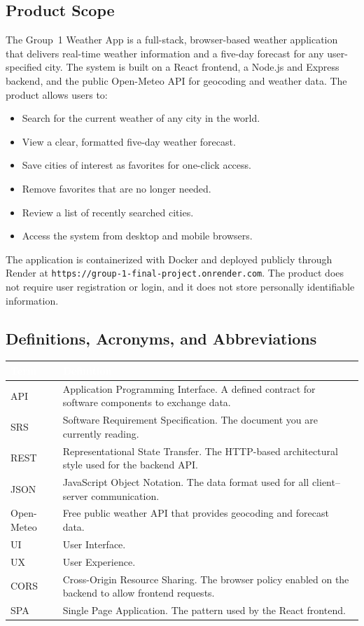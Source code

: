 \documentclass[11pt,letterpaper]{article}
\newcommand{\thead}[1]{\textcolor{white}{\bfseries #1}}
\begin{document}
\subsection{Product Scope}
The Group~1 Weather App is a full-stack, browser-based weather application that delivers real-time weather information and a five-day forecast for any user-specified city. The system is built on a React frontend, a Node.js and Express backend, and the public Open-Meteo API for geocoding and weather data. The product allows users to:
\begin{itemize}
  \item Search for the current weather of any city in the world.
  \item View a clear, formatted five-day weather forecast.
  \item Save cities of interest as favorites for one-click access.
  \item Remove favorites that are no longer needed.
  \item Review a list of recently searched cities.
  \item Access the system from desktop and mobile browsers.
\end{itemize}
The application is containerized with Docker and deployed publicly through Render at \texttt{https://group-1-final-project.onrender.com}. The product does not require user registration or login, and it does not store personally identifiable information.

\subsection{Definitions, Acronyms, and Abbreviations}
\begin{tabularx}{\linewidth}{| L{1.2in} | Y |}
\hline
{}\thead{Term} & \thead{Definition} \\
\hline
API & Application Programming Interface. A defined contract for software components to exchange data. \\ \hline
{}SRS & Software Requirement Specification. The document you are currently reading. \\ \hline
REST & Representational State Transfer. The HTTP-based architectural style used for the backend API. \\ \hline
{}JSON & JavaScript Object Notation. The data format used for all client--server communication. \\ \hline
Open-Meteo & Free public weather API that provides geocoding and forecast data. \\ \hline
{}UI & User Interface. \\ \hline
UX & User Experience. \\ \hline
{}CORS & Cross-Origin Resource Sharing. The browser policy enabled on the backend to allow frontend requests. \\ \hline
SPA & Single Page Application. The pattern used by the React frontend. \\ \hline
\end{tabularx}
\end{document}
